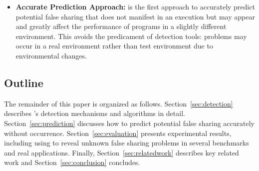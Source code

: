 \begin{itemize}
\item
\textbf{Accurate Prediction Approach:} is the first approach to accurately predict potential false sharing that does
not manifest in an execution but may appear and greatly affect the performance of programs 
in a slightly different environment. 
This avoids the predicament of detection tools: problems may occur in a real
environment rather than test environment due to environmental changes. 


\end{itemize}

\subsection*{Outline}

The remainder of this paper is organized as follows. 
Section~\ref{sec:detection} describes 's detection mechanisms and
algorithms in detail.
Section~\ref{sec:prediction} discusses how to predict potential false sharing accurately 
without occurrence. 
Section~\ref{sec:evaluation} presents experimental results, including using  to 
reveal unknown false sharing problems in several benchmarks and real applications. 
Finally, 
Section~\ref{sec:relatedwork} describes key related work and Section~\ref{sec:conclusion} concludes.


